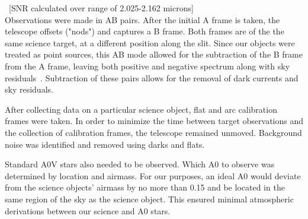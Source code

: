 ~[SNR calculated over range of 2.025-2.162 microns]\\




Observations were made in AB pairs.  After the initial A frame is taken, the telescope offsets ("nods") and captures a B frame.  Both frames are of the the same science target, at a different position along the slit.  Since our objects were treated as point sources, this AB mode allowed for the subtraction of the B frame from the A frame, leaving both positive and negative spectrum along with sky residuals~\cite{Cushing_2004}. Subtraction of these pairs allows for the removal of dark currents and sky residuals.



After collecting data on a particular science object, 
flat and arc calibration frames were taken.  
In order to minimize the time between target observations and 
the collection of calibration frames, the telescope remained unmoved.  
Background noise was identified and removed using darks and flats.



Standard A0V stars also needed to be observed.  Which A0 to observe was 
determined by location and airmass.  For our purposes, an ideal A0 would 
deviate from the science objects' airmass by no more than 0.15 and be located 
in the same region of the sky as the science object.  This ensured minimal 
atmospheric derivations between our science and A0 stars.

